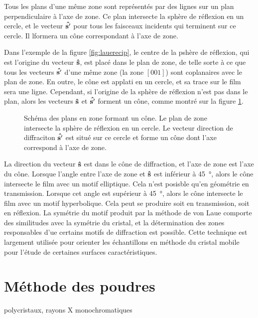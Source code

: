 Tous les plans d'une même zone sont représentés par des lignes sur un plan perpendiculaire à l'axe de zone. Ce plan intersecte la sphère de réflexion en un cercle, et le vecteur $\mathbf{\hat{s'}}$ pour tous les faisceaux incidents qui terminent sur ce cercle. Il lformera un cône correspondant à l'axe de zone.

Dans l'exemple de la figure \ref{fig:lauerecip}, le centre de la pshère de réflexion, qui est l'origine du vecteur $\mathbf{\hat{s}}$, est placé dans le plan de zone, de telle sorte à ce que tous les vecteurs $\mathbf{\hat{s'}}$ d'une même zone (la zone $[001]$) sont coplanaires avec le plan de zone. En outre, le cône est applati en un cercle, et sa trace sur le film sera une ligne. Cependant, si l'origine de la sphère de réflexion n'est pas dans le plan, alors les vecteurs $\mathbf{\hat{s}}$ et $\mathbf{\hat{s'}}$  forment un cône, comme montré sur la figure \ref{fig:lauecone}.

\begin{figure}
    \TODO
    \caption{Schéma des plans en zone formant un cône. Le plan de zone intersecte la sphère de réflexion en un cercle. Le vecteur direction de diffraciton $\mathbf{\hat{s'}}$ est situé sur ce cercle et forme un cône dont l'axe correspond à l'axe de zone.}
    \label{fig:lauecone}
\end{figure}

La direction du vecteur $\mathbf{\hat{s}}$ est dans le cône de diffraction, et l'axe de zone est l'axe du cône. Lorsque l'angle entre l'axe de zone et $\mathbf{\hat{s}}$ est inférieur à \SI{45}{\degree}, alors le cône intersecte le film avec un motif elliptique. Cela n'est posisble qu'en géométrie en transmission. Lorsque cet angle est supérieur à \SI{45}{\degree}, alors le cône intersecte le film avec un motif hyperbolique. Cela peut se produire soit en transmission, soit en réflexion. La symétrie du motif produit par la méthode de von Laue comporte des similitudes avec la symétrie du cristal, et la détermination des zones responsables d'ue certains motifs de diffraction est possible. Cette technique est largement utilisée pour orienter les échantillons en méthode du cristal mobile pour l'étude de certaines surfaces caractéristiques.


\section{Méthode des poudres}
polycristaux, rayons X monochromatiques


